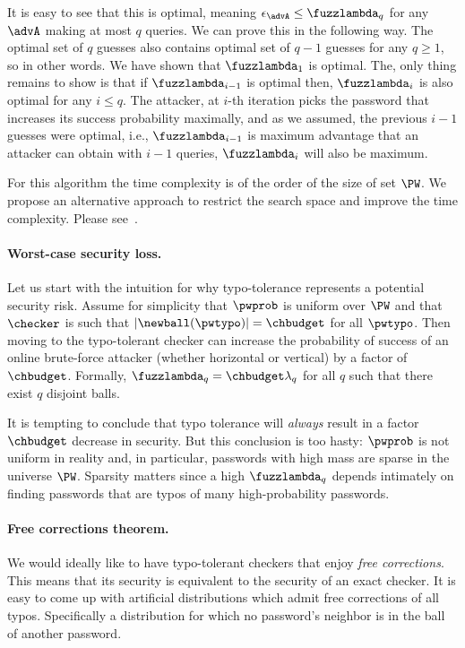 It is easy to see that this is optimal, meaning
$\epsilon_\advA \le \fuzzlambda_q$ for any $\advA$ making at most $q$
queries.  We can prove this in the following way. The optimal set of
$q$ guesses also contains optimal set of $q-1$ guesses for any
$q\ge 1$, so in other words. We have shown that $\fuzzlambda_1$ is
optimal. The, only thing remains to show is that if
$\fuzzlambda_{i-1}$ is optimal then, $\fuzzlambda_i$ is also optimal
for any $i\le q$. The attacker, at $i$-th iteration picks the password
that increases its success probability maximally, and as we assumed,
the previous $i-1$ guesses were optimal, i.e., $\fuzzlambda_{i-1}$ is
maximum advantage that an attacker can obtain with $i-1$ queries,
$\fuzzlambda_{i}$ will also be maximum. 

For this algorithm the time complexity is of the order of the size of
set $\PW$. We propose an alternative approach to restrict the search
space and improve the time complexity. Please see~.

\paragraph{Worst-case security loss.} 
Let us start with the intuition for why typo-tolerance represents a potential 
security risk.  Assume for simplicity that $\pwprob$ is uniform over $\PW$ and that $\checker$ is such that
$|\newball(\pwtypo)| = \chbudget$ for all $\pwtypo$. Then moving to the typo-tolerant checker can increase the
probability of success of an online brute-force attacker (whether horizontal or
vertical) by a factor of $\chbudget$. Formally, 
$\fuzzlambda_q = \chbudget \lambda_q$ for all $q$ such that there exist $q$ disjoint balls.

It is tempting to conclude that typo tolerance will \emph{always} result in a
factor $\chbudget$ decrease in security. But this conclusion is too hasty:
$\pwprob$ is not uniform in reality and, in particular, passwords with high
mass are sparse in the universe $\PW$. Sparsity matters since a high
$\fuzzlambda_q$ depends intimately on finding passwords that are typos of many
high-probability passwords. 

\paragraph{Free corrections theorem.} 
We would ideally like to have typo-tolerant checkers that
enjoy \emph{free corrections}. This means that  
its security is equivalent to the security of an exact checker.  
It is easy to come up with artificial distributions 
which admit free corrections of all typos. Specifically a distribution for
which no password's neighbor is in the ball of another password. 

